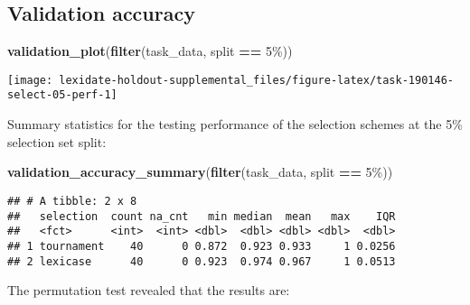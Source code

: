 \documentclass[
]{book}
\newenvironment{Shaded}{\begin{snugshade}}{\end{snugshade}}
\newcommand{\AttributeTok}[1]{\textcolor[rgb]{0.13,0.29,0.53}{#1}}
\newcommand{\DecValTok}[1]{\textcolor[rgb]{0.00,0.00,0.81}{#1}}
\newcommand{\FunctionTok}[1]{\textcolor[rgb]{0.13,0.29,0.53}{\textbf{#1}}}
\newcommand{\NormalTok}[1]{#1}
\newcommand{\OtherTok}[1]{\textcolor[rgb]{0.56,0.35,0.01}{#1}}
\newcommand{\SpecialCharTok}[1]{\textcolor[rgb]{0.81,0.36,0.00}{\textbf{#1}}}
\newcommand{\StringTok}[1]{\textcolor[rgb]{0.31,0.60,0.02}{#1}}
\begin{document}
\hypertarget{validation-accuracy-15}{%
\subsection{Validation accuracy}\label{validation-accuracy-15}}

\begin{Shaded}
\begin{Highlighting}[]
\FunctionTok{validation\_plot}\NormalTok{(}\FunctionTok{filter}\NormalTok{(task\_data, split }\SpecialCharTok{==} \StringTok{\textquotesingle{}5\%\textquotesingle{}}\NormalTok{))}
\end{Highlighting}
\end{Shaded}

\texttt{[image: lexidate-holdout-supplemental\_files/figure-latex/task-190146-select-05-perf-1]}

Summary statistics for the testing performance of the selection schemes at the 5\% selection set split:

\begin{Shaded}
\begin{Highlighting}[]
\FunctionTok{validation\_accuracy\_summary}\NormalTok{(}\FunctionTok{filter}\NormalTok{(task\_data, split }\SpecialCharTok{==} \StringTok{\textquotesingle{}5\%\textquotesingle{}}\NormalTok{))}
\end{Highlighting}
\end{Shaded}

\begin{verbatim}
## # A tibble: 2 x 8
##   selection  count na_cnt   min median  mean   max    IQR
##   <fct>      <int>  <int> <dbl>  <dbl> <dbl> <dbl>  <dbl>
## 1 tournament    40      0 0.872  0.923 0.933     1 0.0256
## 2 lexicase      40      0 0.923  0.974 0.967     1 0.0513
\end{verbatim}

The permutation test revealed that the results are:

\begin{Shaded}
\end{Shaded}
\end{document}
